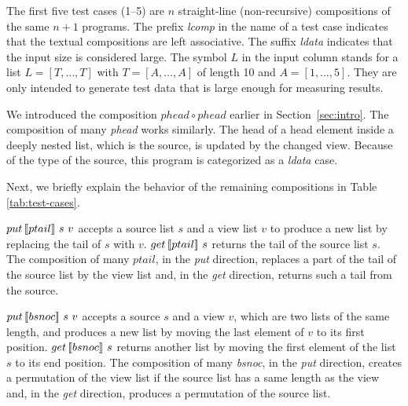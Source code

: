 The first five test cases
(1--5) 
are $n$ straight-line (non-recursive) compositions of the same $n + 1$ 
programs.
The prefix \textit{lcomp} in the name of a test case indicates that the textual compositions are left associative.
The suffix \textit{ldata} indicates that the input size is considered large. The symbol $L$ in the input column 
stands for a list $L = [T,\ldots,T]$ with
$T = [A,\ldots,A]$ of length 10
and
$A = [1,\ldots,5]$. 
They are only intended to generate test data that is large enough for 
measuring
results. 

We introduced the composition $phead \circ phead$ earlier in Section~\ref{sec:intro}. The composition of many \textit{phead} 
works similarly. The head of a head element inside a 
deeply nested list, which 
is the source, 
is updated by the changed view. Because of the type of the source, this program is 
categorized as a \textit{ldata} case. 

Next, we briefly explain the behavior of the remaining compositions in 
\mbox{Table\,\ref{tab:test-cases}.}%

$put \, [\![ptail]\!] \ s \ v$ accepts a source list $s$ and a view list $v$ to produce a new list by replacing the tail of $s$ with $v$. $get \, [\![ptail]\!] \ s$ returns the tail of the source list $s$. The composition of many $ptail$, in the \textit{put} direction, replaces a part of the tail of the source list by the view list and, in the \textit{get} direction, returns such a tail from the source.

$put \, [\![bsnoc]\!] \ s \ v$ accepts a source $s$ and a view $v$, 
which are two lists of the same length,
and produces a new list by moving the last element of $v$ to its first position. $get \, [\![bsnoc]\!] \ s$ returns another list by moving the first element of the list $s$ to its end position. The composition of many \textit{bsnoc}, in the \textit{put} direction, creates a permutation of the view list if the source list has a same length as the view and, in the \textit{get} direction, produces a permutation of the source list.

